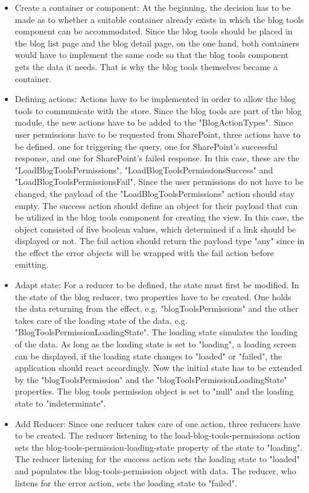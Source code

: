 \documentclass[Bachelor,BIF,english]{twbook}
\begin{document}
\begin{itemize}
\item Create a container or component: At the beginning, the decision has to be made as to whether a suitable container already exists in which the blog tools component can be accommodated. Since the blog tools should be placed in the blog list page and the blog detail page, on the one hand, both containers would have to implement the same code so that the blog tools component gets the data it needs. That is why the blog tools themselves became a container.
\item Defining actions: Actions have to be implemented in order to allow the blog tools to communicate with the store. Since the blog tools are part of the blog module, the new actions have to be added to the "BlogActionTypes". Since user permissions have to be requested from SharePoint, three actions have to be defined, one for triggering the query, one for SharePoint's successful response, and one for SharePoint's failed response. In this case, these are the "LoadBlogToolsPermissions", "LoadBlogToolsPermissionsSuccess" and "LoadBlogToolsPermissionsFail". Since the user permissions do not have to be changed, the payload of the "LoadBlogToolsPermissions" action should stay empty. The success action should define an object for their payload that can be utilized in the blog tools component for creating the view. In this case, the object consisted of five boolean values, which determined if a link should be displayed or not. The fail action should return the payload type "any" since in the effect the error objects will be wrapped with the fail action before emitting.
\item Adapt state: For a reducer to be defined, the state must first be modified. In the state of the blog reducer, two properties have to be created. One holds the data returning from the effect, e.g. "blogToolsPermissions" and the other takes care of the loading state of the data, e.g. "BlogToolsPermissionLoadingState". The loading state simulates the loading of the data. As long as the loading state is set to "loading", a loading screen can be displayed, if the loading state changes to "loaded" or "failed", the application should react accordingly. Now the initial state has to be extended by the "blogToolsPermission" and the "blogToolsPermissionLoadingState" properties. The blog tools permission object is set to "null" and the loading state to "indeterminate".
\item Add Reducer: Since one reducer takes care of one action, three reducers have to be created. The reducer listening to the load-blog-tools-permissions action sets the blog-tools-permission-loading-state property of the state to "loading". The reducer listening for the success action sets the loading state to "loaded" and populates the blog-tools-permission object with data. The reducer, who listens for the error action, sets the loading state to "failed".

\end{itemize}
\end{document}
